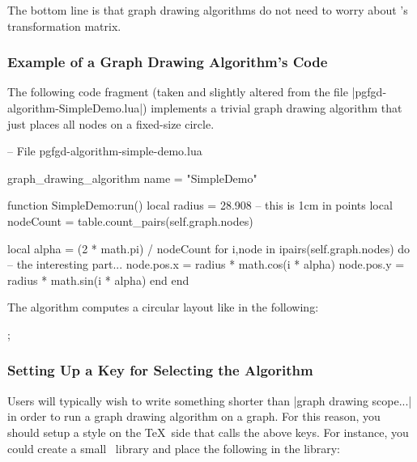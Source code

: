 The bottom line is that graph drawing algorithms do not need to worry
about \pgfname's transformation matrix.



\subsubsection{Example of a Graph Drawing Algorithm's Code}

The following code fragment (taken and slightly altered
from the file |pgfgd-algorithm-SimpleDemo.lua|)
implements a trivial graph drawing algorithm that just places all
nodes on a fixed-size circle.  



\begin{codeexample}
-- File pgfgd-algorithm-simple-demo.lua
  
graph_drawing_algorithm { name = "SimpleDemo" }

function SimpleDemo:run()
   local radius = 28.908  -- this is 1cm in points
   local nodeCount = table.count_pairs(self.graph.nodes)

   local alpha = (2 * math.pi) / nodeCount
   for i,node in ipairs(self.graph.nodes) do
      -- the interesting part...
      node.pos.x = radius * math.cos(i * alpha)
      node.pos.y = radius * math.sin(i * alpha)
   end
end
\end{codeexample}

The algorithm computes a circular layout like in the following:

\begin{codeexample}[]
\tikz [graph drawing scope, /graph drawing/algorithm=Simple Demo]
  ;
\end{codeexample}


\subsubsection{Setting Up a Key for Selecting the Algorithm}

Users will typically wish to write something shorter than
|graph drawing scope...| in order to run a graph drawing algorithm on
a graph. For this reason, you should setup a style on the \TeX\ side
that calls the above keys. For instance, you could create a small
\tikzname\ library and place the following in the library:

